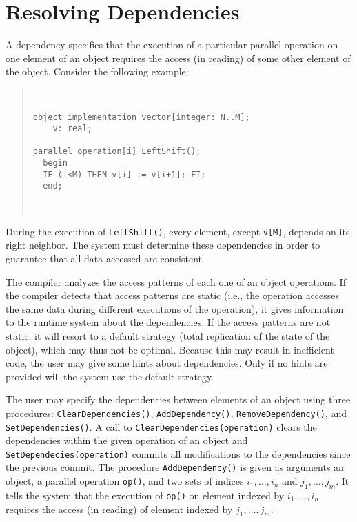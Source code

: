\documentclass{article}
\newenvironment{example}
  {\begin{quote} ~\hrulefill }
  {~\hrulefill \end{quote} }
\begin{document}
\section{Resolving Dependencies}

A dependency specifies that the execution of a particular parallel
operation on one element of an object requires the access (in reading)
of some other element of the object. Consider the following example:

\begin{example}
\begin{verbatim}
object implementation vector[integer: N..M];
    v: real;

parallel operation[i] LeftShift();
  begin
  IF (i<M) THEN v[i] := v[i+1]; FI;
  end;
\end{verbatim}
\end{example}

During the execution of \verb+LeftShift()+, every element, except
\verb+v[M]+, depends on its right neighbor. The system must determine
these dependencies in order to guarantee that all data accessed are
consistent.

The compiler analyzes the access patterns of each one of an object
operations. If the compiler detects that access patterns are static
(i.e., the operation accesses the same data during different
executions of the operation), it gives information to the runtime
system about the dependencies. If the access patterns are not static,
it will resort to a default strategy (total replication of the state
of the object), which may thus not be optimal. Because this may result
in inefficient code, the user may give some hints about
dependencies. Only if no hints are provided will the system use the
default strategy.

The user may specify the dependencies between elements of an object
using three procedures: \verb+ClearDependencies()+,
\verb+AddDependency()+, \verb+RemoveDependency()+, and
\verb+SetDependencies()+. A call to
\verb+ClearDependencies(operation)+ clears the dependencies
within the given operation of an object and
\verb+SetDependecies(operation)+ commits all modifications to
the dependencies since the previous commit. The procedure
\verb+AddDependency()+ is given as arguments an object, a parallel operation
\verb+op()+, and two sets of indices $i_1,\ldots,i_n$ and
$j_1,\ldots,j_m$. It tells the system that the execution of
\verb+op()+ on element indexed by $i_1,\ldots,i_n$ requires the access
(in reading) of element indexed by $j_1,\ldots,j_m$.
\end{document}
